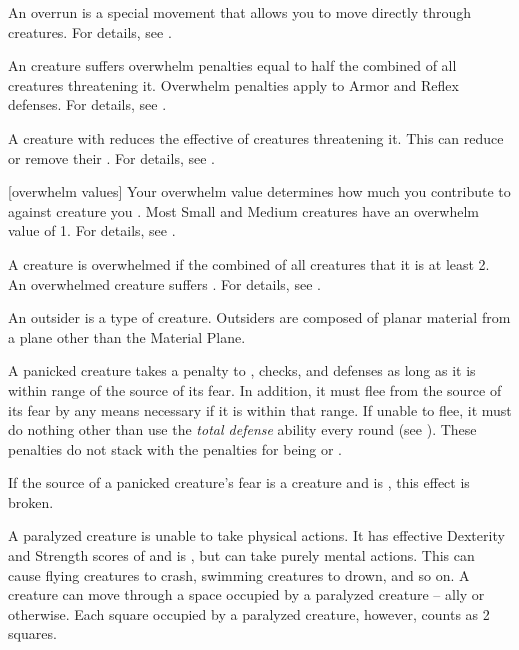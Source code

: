  An overrun is a special movement that allows you to move directly through creatures.
For details, see .

 An  creature suffers overwhelm penalties equal to half the combined  of all creatures threatening it.
Overwhelm penalties apply to Armor and Reflex defenses.
For details, see .

 A creature with  reduces the effective  of creatures threatening it.
This can reduce or remove their .
For details, see .

[overwhelm values] Your overwhelm value determines how much you contribute to  against creature you .
Most Small and Medium creatures have an overwhelm value of 1.
For details, see .

 A creature is overwhelmed if the combined  of all creatures that  it is at least 2.
An overwhelmed creature suffers .
For details, see .

 An outsider is a type of creature.
Outsiders are composed of planar material from a plane other than the Material Plane.

 A panicked creature takes a  penalty to , checks, and defenses as long as it is within \rngmed range of the source of its fear.
In addition, it must flee from the source of its fear by any means necessary if it is within that range.
If unable to flee, it must do nothing other than use the \textit{total defense} ability every round (see ).
These penalties do not stack with the penalties for being \shaken or \panicked.

If the source of a panicked creature's fear is a creature and is , this effect is broken.

 A paralyzed creature is unable to take physical actions. It has effective Dexterity and Strength scores of  and is \helpless, but can take purely mental actions. This can cause flying creatures to crash, swimming creatures to drown, and so on. A creature can move through a space occupied by a paralyzed creature -- ally or otherwise. Each square occupied by a paralyzed creature, however, counts as 2 squares.

